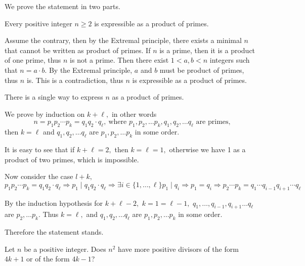 \documentclass{article}
\begin{document}
\begin{soln}
    We prove the statement in two parts.
    \begin{claim*}
        Every positive integer $n \ge 2$ is expressible as a product of primes.
    \end{claim*}
    \begin{subproof}
        Assume the contrary, then by the Extremal principle, there exists a minimal $n$ that cannot be written as product of primes.
        If $n$ is a prime, then it is a product of one prime, thus $n$ is not a prime. Then there exist $1 < a, b < n$ integers such that
        $n=a\cdot b.$ By the Extremal principle, $a$ and $b$ must be product of primes, thus $n$ is.
        This is a contradiction, thus $n$ is expressible as a product of primes.
    \end{subproof}

    \begin{claim*}
        There is a single way to express $n$ as a product of primes.
    \end{claim*}
    \begin{subproof}
        We prove by induction on $k+\ell,$ in other words
        \[
            n = p_1 p_2 \cdots p_k = q_1 q_2 \cdot q_{\ell},\ \text{where } p_1, p_2, \ldots p_k, q_1, q_2, \ldots q_{\ell} \text{\ are primes,}
        \]
        then $k = \ell$ and $q_1, q_2, \ldots q_{\ell}$ are $p_1, p_2, \ldots p_k$ in some order.

        It is easy to see that if $k+\ell=2,$ then $k=\ell=1,$ otherwise we have 1 as a product of two primes, which is impossible.

        Now consider the case $l+k,$
        \[
            p_1 p_2 \cdots p_k = q_1 q_2 \cdot q_{\ell} \Rightarrow p_1 \mid q_1 q_2 \cdot q_{\ell} \Rightarrow \exists i \in \{1,\ldots,\ell\} p_1 \mid q_i 
            \Rightarrow p_1 = q_i \Rightarrow  p_2 \cdots p_k = q_1 \cdots q_{i-1} q_{i+1} \cdots q_{\ell}
        \]

        By the induction hypothesis for $k+\ell-2,$ $k=1=\ell-1,$ $q_1, \ldots, q_{i-1}, q_{i+1} \ldots q_{\ell}$ are $p_2, \ldots p_k.$
        Thus $k = \ell,$ and $q_1, q_2, \ldots q_{\ell}$ are $p_1, p_2, \ldots p_k$ in some order.

        Therefore the statement stands.
    \end{subproof}
\end{soln}

\begin{problem}
    Let $n$ be a positive integer. Does $n^2$ have more positive divisors of the form $4k+1$ or of the form $4k-1$?
\end{problem}
\end{document}
